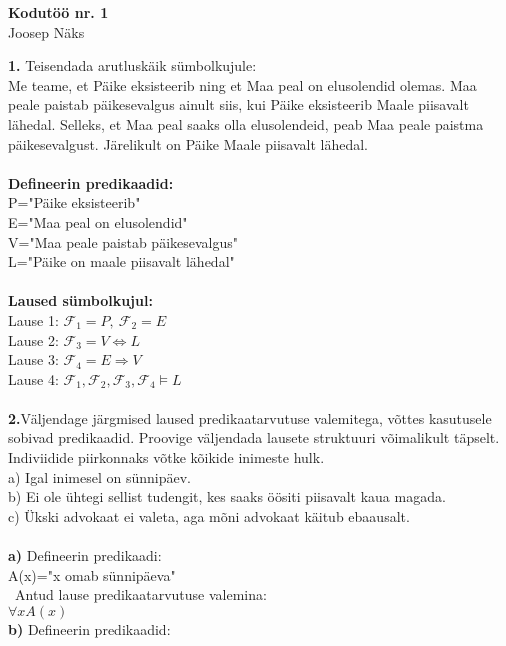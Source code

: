 \documentclass{article}
\begin{document}
\begin{center}
\Large\textbf{Kodutöö nr. 1}\\
Joosep Näks
\end{center}
\textbf{1.} Teisendada arutluskäik sümbolkujule:\\
Me teame, et Päike eksisteerib ning et Maa peal on elusolendid olemas. Maa peale paistab päikesevalgus ainult siis, kui Päike eksisteerib Maale piisavalt lähedal. Selleks, et Maa peal saaks olla elusolendeid, peab Maa peale paistma päikesevalgust. Järelikult on Päike Maale piisavalt lähedal.\\\\
\textbf{Defineerin predikaadid:}\\
P="Päike eksisteerib"\\
E="Maa peal on elusolendid"\\
V="Maa peale paistab päikesevalgus"\\
L="Päike on maale piisavalt lähedal"\\\\
\textbf{Laused sümbolkujul:}\\
Lause 1: $\mathcal{F}_1 = P,\ \mathcal{F}_2 = E$\\
Lause 2: $\mathcal{F}_3 = V\Leftrightarrow L$\\
Lause 3: $\mathcal{F}_4 = E\Rightarrow V$\\
Lause 4: $\mathcal{F}_1,\mathcal{F}_2, \mathcal{F}_3, \mathcal{F}_4 \models L$\\\\
\textbf{2.}Väljendage järgmised laused predikaatarvutuse valemitega, võttes kasutusele sobivad predikaadid. Proovige väljendada lausete struktuuri võimalikult täpselt. Indiviidide piirkonnaks võtke kõikide inimeste hulk.\\
\null\quad a) Igal inimesel on sünnipäev.\\
\null\quad b) Ei ole ühtegi sellist tudengit, kes saaks öösiti piisavalt kaua magada.\\
\null\quad c) Ükski advokaat ei valeta, aga mõni advokaat käitub ebaausalt.\\\\
\textbf{a)} Defineerin predikaadi:\\
\null\quad\quad A(x)="x omab sünnipäeva"\\
\null\quad\ Antud lause predikaatarvutuse valemina:\\
\null\quad\quad $\forall xA(x)$\\
\textbf{b)} Defineerin predikaadid:\\
\end{document}
